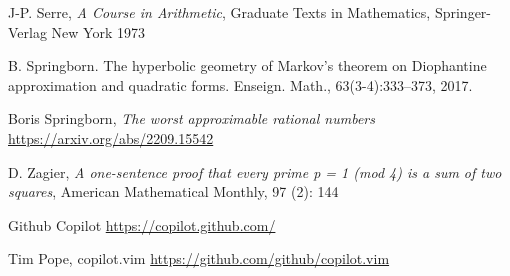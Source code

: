 \documentclass[12pt]{amsart}
\theoremstyle{plain}
\theoremstyle{definition}
\begin{document}

J-P. Serre,
\textit{A Course in Arithmetic},
Graduate Texts in Mathematics,
Springer-Verlag New York
1973



B. Springborn. The hyperbolic geometry of Markov’s theorem on Diophantine
approximation and quadratic forms. Enseign. Math., 63(3-4):333–373, 2017.

Boris Springborn,
\textit{The worst approximable rational numbers}
\url{https://arxiv.org/abs/2209.15542}




D. Zagier,
 \textit{A one-sentence proof that every prime p = 1 (mod 4) is a sum of two squares}, 
 American Mathematical Monthly, 97 (2): 144

 Github Copilot \url{https://copilot.github.com/}

Tim Pope, copilot.vim \url{https://github.com/github/copilot.vim}
 

 
\end{document}
